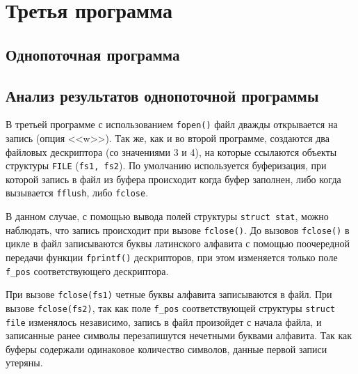 \section{Третья программа}

\captionsetup{singlelinecheck = false, justification=raggedright}


\subsection{Однопоточная программа}
\captionsetup{singlelinecheck = false, justification=raggedright}



\captionsetup{singlelinecheck = false, justification=raggedright}



\subsection{Анализ результатов однопоточной программы}

В третьей программе с использованием \texttt{fopen()} файл дважды открывается на запись (опция <<w>>). Так же, как и во второй программе, создаются два файловых дескриптора (со значениями 3 и 4), на которые ссылаются объекты структуры \texttt{FILE} (\texttt{fs1, fs2}). По умолчанию используется
буферизация, при которой запись в файл из буфера происходит когда буфер заполнен, либо когда вызывается \texttt{fflush}, либо \texttt{fclose}.

В данном случае, с помощью вывода полей структуры \texttt{struct stat}, можно наблюдать, что запись происходит при вызове \texttt{fclose()}. До
вызовов \texttt{fclose()} в цикле в файл записываются буквы латинского
алфавита с помощью поочередной передачи функции \texttt{fprintf()} дескрипторов, при этом изменяется только поле \texttt{f\_pos} соответствующего дескриптора.

При вызове \texttt{fclose(fs1)} четные буквы алфавита записываются в файл.
При вызове \texttt{fclose(fs2)}, так как поле \texttt{f\_pos}
соответствующей структуры \texttt{struct file} изменялось независимо, запись в файл
произойдет с начала файла, и записанные ранее символы перезапишутся нечетными буквами алфавита. Так как буферы содержали одинаковое количество символов, данные первой
записи утеряны.

